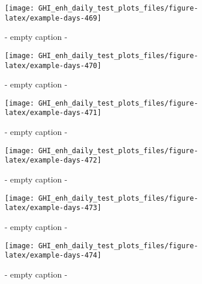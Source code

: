 \documentclass[
  10pt,
  a4paper,oneside]{article}
\begin{document}
\begin{figure}[H]

{\centering \texttt{[image: GHI\_enh\_daily\_test\_plots\_files/figure-latex/example-days-469]} 

}

\caption{ - empty caption - }\label{fig:example-days-469}
\end{figure}

\begin{figure}[H]

{\centering \texttt{[image: GHI\_enh\_daily\_test\_plots\_files/figure-latex/example-days-470]} 

}

\caption{ - empty caption - }\label{fig:example-days-470}
\end{figure}

\begin{figure}[H]

{\centering \texttt{[image: GHI\_enh\_daily\_test\_plots\_files/figure-latex/example-days-471]} 

}

\caption{ - empty caption - }\label{fig:example-days-471}
\end{figure}

\begin{figure}[H]

{\centering \texttt{[image: GHI\_enh\_daily\_test\_plots\_files/figure-latex/example-days-472]} 

}

\caption{ - empty caption - }\label{fig:example-days-472}
\end{figure}

\begin{figure}[H]

{\centering \texttt{[image: GHI\_enh\_daily\_test\_plots\_files/figure-latex/example-days-473]} 

}

\caption{ - empty caption - }\label{fig:example-days-473}
\end{figure}

\begin{figure}[H]

{\centering \texttt{[image: GHI\_enh\_daily\_test\_plots\_files/figure-latex/example-days-474]} 

}

\caption{ - empty caption - }\label{fig:example-days-474}
\end{figure}
\end{document}

